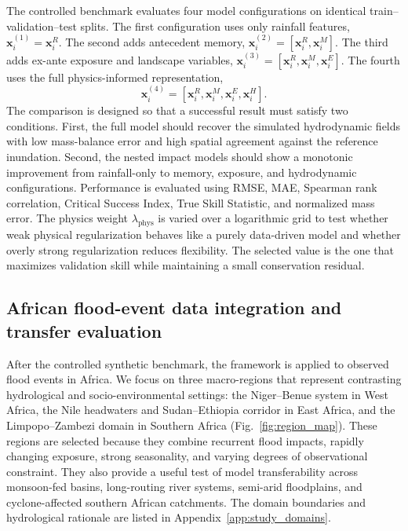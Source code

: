 \documentclass[pdflatex,sn-mathphys-ay]{sn-jnl}
\theoremstyle{thmstyleone}
\theoremstyle{thmstylethree}
\theoremstyle{thmstyletwo}
\begin{document}
The controlled benchmark evaluates four model configurations on
identical train--validation--test splits.  The first configuration uses
only rainfall features, $\mathbf{x}^{(1)}_i=\mathbf{x}^{R}_i$.  The
second adds antecedent memory,
$\mathbf{x}^{(2)}_i=[\mathbf{x}^{R}_i,\mathbf{x}^{M}_i]$.  The third
adds ex-ante exposure and landscape variables,
$\mathbf{x}^{(3)}_i=
[\mathbf{x}^{R}_i,\mathbf{x}^{M}_i,\mathbf{x}^{E}_i]$.  The fourth
uses the full physics-informed representation,
\begin{equation}
  \mathbf{x}^{(4)}_i
  =
  [
    \mathbf{x}^{R}_i,
    \mathbf{x}^{M}_i,
    \mathbf{x}^{E}_i,
    \mathbf{x}^{H}_i
  ].
  \label{eq:synthetic_nested_models}
\end{equation}
The comparison is designed so that a successful result must satisfy
two conditions.  First, the full model should recover the simulated
hydrodynamic fields with low mass-balance error and high spatial
agreement against the reference inundation.  Second, the nested impact
models should show a monotonic improvement from rainfall-only to
memory, exposure, and hydrodynamic configurations.  Performance is
evaluated using RMSE, MAE, Spearman rank correlation, Critical Success
Index, True Skill Statistic, and normalized mass error.  The physics
weight $\lambda_{\mathrm{phys}}$ is varied over a logarithmic grid to
test whether weak physical regularization behaves like a purely
data-driven model and whether overly strong regularization reduces
flexibility.  The selected value is the one that maximizes validation
skill while maintaining a small conservation residual.

\subsection{African flood-event data integration and transfer evaluation}
\label{subsec:africa_data_transfer}

After the controlled synthetic benchmark, the framework is applied to
observed flood events in Africa.  We focus on three macro-regions that
represent contrasting hydrological and socio-environmental settings:
the Niger--Benue system in West Africa, the Nile headwaters and
Sudan--Ethiopia corridor in East Africa, and the Limpopo--Zambezi
domain in Southern Africa (Fig.~\ref{fig:region_map}).  These regions
are selected because they combine recurrent flood impacts, rapidly
changing exposure, strong seasonality, and varying degrees of
observational constraint.  They also provide a useful test of model
transferability across monsoon-fed basins, long-routing river systems,
semi-arid floodplains, and cyclone-affected southern African
catchments.  The domain boundaries and hydrological rationale are
listed in Appendix~\ref{app:study_domains}.
\end{document}
